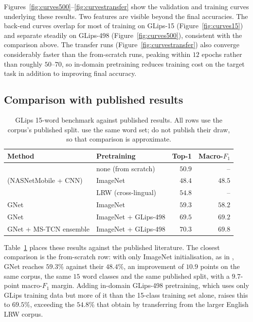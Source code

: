 \documentclass[10pt, a4paper]{article}
\begin{document}
\noindent Figures~\ref{fig:curves500}--\ref{fig:curvestransfer} show the validation and training curves underlying these results. Two features are visible beyond the final accuracies. The back-end curves overlap for most of training on GLips-15 (Figure~\ref{fig:curves15}) and separate steadily on GLips-498 (Figure~\ref{fig:curves500}), consistent with the comparison above. The transfer runs (Figure~\ref{fig:curvestransfer}) also converge considerably faster than the from-scratch runs, peaking within $12$ epochs rather than roughly $50$--$70$, so in-domain pretraining reduces training cost on the target task in addition to improving final accuracy.
\subsection{Comparison with published results}
\begin{table}[!htb]
\centering
\caption{GLips 15-word benchmark against published results. All rows use the corpus's published split. \citet{ameer2024} use the same word set; \citet{schwiebert2022glips} do not publish their draw, so that comparison is approximate.}
\label{tab:sota}
\begin{tabular}{@{}llrr@{}}
\toprule
Method & Pretraining & Top-1 & Macro-$F_1$ \\
\midrule
\citet{schwiebert2022glips}   & none (from scratch)      & $50.9$ & -- \\
\citet{ameer2024} (NASNetMobile + CNN) & ImageNet        & $48.4$ & $48.5$ \\
\citet{schwiebert2022glips}   & LRW (cross-lingual)      & $54.8$ & -- \\
\midrule
GNet                          & ImageNet                 & $59.3$ & $58.2$ \\
GNet                          & ImageNet + GLips-498     & $69.5$ & $69.2$ \\
GNet + MS-TCN ensemble        & ImageNet + GLips-498     & $\mathbf{70.3}$ & $\mathbf{69.8}$ \\
\bottomrule
\end{tabular}
\end{table}
\noindent Table~\ref{tab:sota} places these results against the published literature. The closest comparison is the from-scratch row: with only ImageNet initialisation, as in \citet{ameer2024}, GNet reaches $59.3\%$ against their $48.4\%$, an improvement of $10.9$ points on the same corpus, the same $15$ word classes and the same published split, with a $9.7$-point macro-$F_1$ margin. Adding in-domain GLips-498 pretraining, which uses only GLips training data but more of it than the 15-class training set alone, raises this to $69.5\%$, exceeding the $54.8\%$ that \citet{schwiebert2022glips} obtain by transferring from the larger English LRW corpus.
\end{document}
